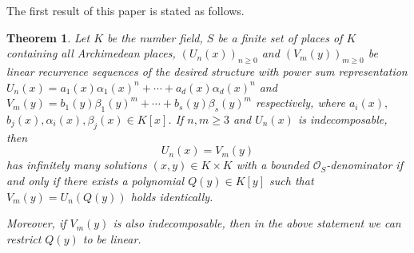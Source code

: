 \documentclass[12pt]{amsart}
\newtheorem{theorem}{Theorem}[section]
\begin{document}
    The first result of this paper is stated as follows.
	
\begin{theorem}\label{thm1}
Let $K$ be the number field, $S$ be a finite set of places of $K$ containing all Archimedean places, $(U_n(x))_{n\geq 0}$ and $(V_m(y))_{m\geq 0}$  be linear recurrence sequences of the desired structure with power sum representation  $U_n(x)=a_1(x)\alpha_1(x)^n+\cdots+a_d(x)\alpha_d(x)^n$ and $V_m(y)=b_1(y)\beta_1(y)^m+\cdots+b_s(y)\beta_s(y)^m$ respectively, where $a_i(x),$ $b_j(x),\alpha_i(x),\beta_j(x)\in K[x]$. If $n,m\geq 3$ and $U_n(x)$ is indecomposable, then 
\begin{equation}\label{thmeq}
			U_n(x)=V_m(y)
\end{equation} has infinitely many solutions $(x,y)\in K\times K$ with a bounded $\mathcal{O}_S$-denominator if and only if there exists a polynomial $Q(y)\in K[y]$ such that $V_m(y)=U_n(Q(y))$ holds identically.

Moreover, if $V_m(y)$ is also indecomposable, then in the above statement we can restrict $Q(y)$ to be linear.
\end{theorem}
\end{document}
